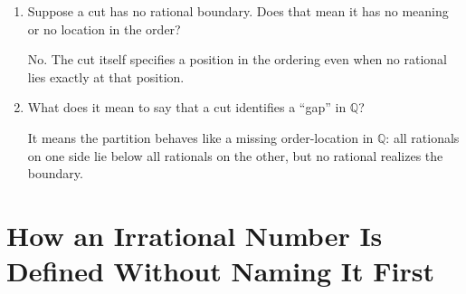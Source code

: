 \documentclass{essay}
\begin{document}
\begin{enumerate}[label=\arabic*., itemsep=10pt]
\item Suppose a cut has no rational boundary. Does that mean it has no meaning or no location in the order?

\begin{answer}
No. The cut itself specifies a position in the ordering even when no rational lies exactly at that position.
\end{answer}

\item What does it mean to say that a cut identifies a ``gap'' in $\mathbb{Q}$?

\begin{answer}
It means the partition behaves like a missing order-location in $\mathbb{Q}$: all rationals on one side lie below all rationals on the other, but no rational realizes the boundary.
\end{answer}

\end{enumerate}

\section{How an Irrational Number Is Defined Without Naming It First}
\end{document}
